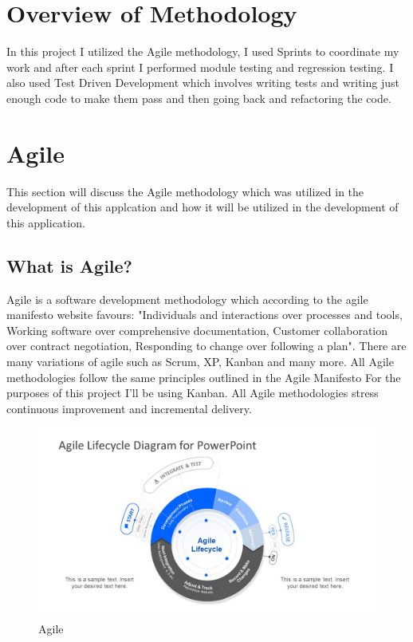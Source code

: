 \section{Overview of Methodology}
In this project I utilized the Agile methodology, I used Sprints to coordinate my work and after each sprint I performed
module testing and regression testing.  I also used Test Driven Development which involves writing tests and writing just
enough code to make them pass and then going back and refactoring the code.
\section{Agile}
This section will discuss the Agile methodology which was utilized in the development of this applcation and how it will be utilized in the development of this application.
\subsection{What is Agile?}
Agile is a software development methodology which according to the agile manifesto website \cite{Agile} favours: "Individuals and interactions over processes and tools,
Working software over comprehensive documentation,
Customer collaboration over contract negotiation,
Responding to change over following a plan".  There are many variations of agile \cite{VariationsofAgile} such as Scrum, XP, Kanban and many more. All Agile methodologies follow the same principles outlined in the Agile Manifesto\cite{Agile} For the purposes of this project I'll be using Kanban.  All Agile methodologies stress
continuous improvement and incremental delivery.
\begin{figure}[h!]
  \includegraphics[width=\textwidth]{img/agile.jpg}
  \caption{Agile}
  \label{fig: Image of Agile Lifecycle}
\end{figure}
\\
\cite{AgileImage}
